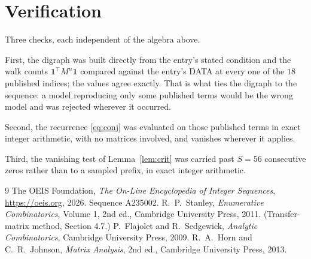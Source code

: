 \documentclass[11pt,a4paper]{article}
\theoremstyle{plain}
\theoremstyle{definition}
\begin{document}
\section{Verification}

Three checks, each independent of the algebra above.

First, the digraph was built directly from the entry's stated condition and the walk counts
$\mathbf{1}^{\!\top}M^{n}\mathbf{1}$ compared against the entry's DATA at every one of
the $18$ published indices; the values agree exactly. That is what ties the digraph to
the sequence: a model reproducing only some published terms would be the wrong model and
was rejected wherever it occurred.

Second, the recurrence \eqref{eq:conj} was evaluated on those published terms in exact
integer arithmetic, with no matrices involved, and vanishes wherever it applies.

Third, the vanishing test of Lemma~\ref{lem:crit} was carried past $S=56$ consecutive
zeros rather than to a sampled prefix, in exact integer arithmetic.

\begin{thebibliography}{9}
 The OEIS Foundation, \emph{The On-Line Encyclopedia of Integer
Sequences}, \url{https://oeis.org}, 2026. Sequence A235002.
 R.~P.~Stanley, \emph{Enumerative Combinatorics}, Volume 1, 2nd ed.,
Cambridge University Press, 2011. (Transfer-matrix method, Section 4.7.)
 P.~Flajolet and R.~Sedgewick, \emph{Analytic Combinatorics}, Cambridge
University Press, 2009.
 R.~A.~Horn and C.~R.~Johnson, \emph{Matrix Analysis}, 2nd ed., Cambridge
University Press, 2013.
\end{thebibliography}
\end{document}
